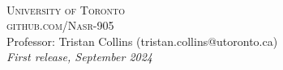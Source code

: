 \documentclass[openany,11pt,fleqn]{book} %
\begin{document}

\newpage
~\vfill
\thispagestyle{empty}


\noindent\textsc{University of Toronto}\\

\noindent \textsc{github.com/Nasr-905}\\ %

\noindent Professor: Tristan Collins (tristan.collins@utoronto.ca)\\ %

\noindent \textit{First release, September 2024} %



\pagestyle{empty} %

\tableofcontents %


\pagestyle{fancy} %




















\end{document}
